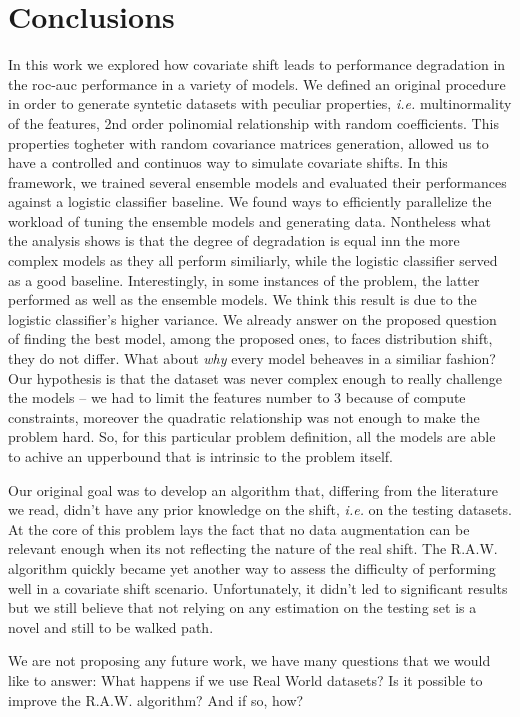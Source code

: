 \chapter{Conclusions}

In this work we explored how covariate shift leads to performance degradation in the roc-auc performance in a variety of models. We defined an original procedure in order to generate syntetic datasets with peculiar properties, \textit{i.e.} multinormality of the features, 2nd order polinomial relationship with random coefficients. This properties togheter with random covariance matrices generation, allowed us to have a controlled and continuos way to simulate covariate shifts. In this framework, we trained several ensemble models and evaluated their performances against a logistic classifier baseline. We found ways to efficiently parallelize the workload of tuning the ensemble models and generating data. Nontheless what the analysis shows is that the degree of degradation is equal inn the more complex models as they all perform similiarly, while the logistic classifier served as a good baseline. Interestingly, in some instances of the problem, the latter performed as well as the ensemble models. We think this result is due to the logistic classifier's higher variance. We already answer on the proposed question of finding the best model, among the proposed ones, to faces distribution shift, they do not differ. What about \textit{why} every model beheaves in a similiar fashion? Our hypothesis is that the dataset was never complex enough to really challenge the models -- we had to limit the features number to 3 because of compute constraints, moreover the quadratic relationship was not enough to make the problem hard. So, for this particular problem definition, all the models are able to achive an {upperbound} that is intrinsic to the problem itself. 

Our original goal was to develop an algorithm that, differing from the literature we read, didn't have any prior knowledge on the shift, \textit{i.e.} on the testing datasets. At the core of this problem lays the fact that no data augmentation can be relevant enough when its not reflecting the nature of the real shift. The R.A.W. algorithm quickly became yet another way to assess the difficulty of performing well in a covariate shift scenario. Unfortunately, it didn't led to significant results but we still believe that not relying on any estimation on the testing set is a novel and still to be walked path.

We are not proposing any future work, we have many questions that we would like to answer: What happens if we use Real World datasets? Is it possible to improve the R.A.W. algorithm? And if so, how?
